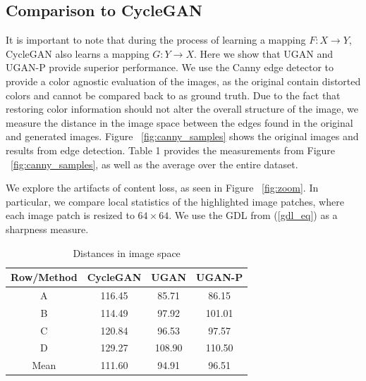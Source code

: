 \documentclass[letterpaper, 10pt, conference]{ieeeconf}
\begin{document}
\subsection{Comparison to CycleGAN}
It is important to note that during the process of learning a mapping $F: X \rightarrow Y$, CycleGAN also learns a
mapping $G: Y \rightarrow X$. Here we show that UGAN and UGAN-P provide superior performance. We use the Canny edge
detector \cite{canny1986computational} to provide a color agnostic evaluation of the images, as the original contain
distorted colors and cannot be compared back to as ground truth. Due to the fact that restoring color information
should not alter the overall structure of the image, we measure the distance in the image space between the edges
found in the original and generated images. Figure ~\ref{fig:canny_samples} shows the original images and results from
edge detection. Table 1 provides the measurements from Figure ~\ref{fig:canny_samples}, as well as the average over the
entire dataset.

We explore the artifacts of content loss, as seen in Figure ~\ref{fig:zoom}. In particular, we compare local statistics
of the highlighted image patches, where each image patch is resized to $64 \times 64$. We use the GDL
\cite{mathieu2015deep} from (\ref{gdl_eq}) as a sharpness measure. 

\begin{table}
\centering
\caption{Distances in image space}
\begin{tabular}{| c | c | c | c |}
   \hline
   Row/Method & CycleGAN & UGAN & UGAN-P \\ \hline
   A          & 116.45 & 85.71  & 86.15  \\ \hline
   B          & 114.49 & 97.92  & 101.01 \\ \hline
   C          & 120.84 & 96.53  & 97.57  \\ \hline
   D          & 129.27 & 108.90 & 110.50 \\ \hline
   Mean       & 111.60 & 94.91  & 96.51 \\ \hline
\end{tabular}
\end{table}

\newpage
\end{document}
